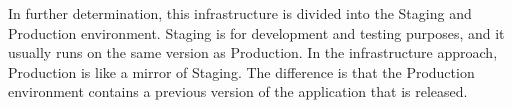 In further determination, this infrastructure is divided into the Staging and Production environment.
Staging is for development and testing purposes, and it usually runs on the same version as Production.
In the infrastructure approach, Production is like a mirror of Staging.
The difference is that the Production environment contains a previous version of the application that is released.






